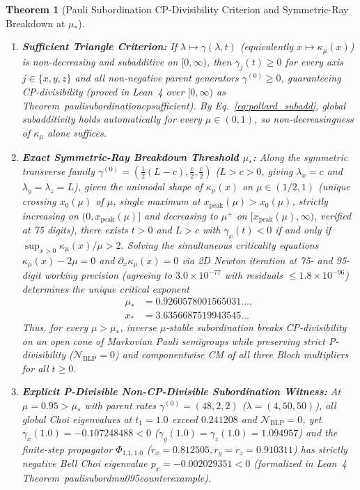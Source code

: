 \documentclass[twocolumn,10pt,amsmath,amssymb,floatfix]{revtex4-2}
\theoremstyle{plain}
\newtheorem{theorem}{Theorem}
\theoremstyle{definition}
\newcommand{\NBLP}{\mathcal{N}_{\mathrm{BLP}}}
\newcommand{\mustar}{\mu_*}
\newcommand{\leanid}[1]{{\footnotesize\ttfamily\def\_{\textunderscore\penalty0\hspace{0pt}}#1}}
\begin{document}
\begin{theorem}[Pauli Subordination CP-Divisibility Criterion and Symmetric-Ray Breakdown at $\mustar$]
\label{thm:pauli_subord}\mbox{}
\begin{enumerate}[label=(\alph*),leftmargin=1.5em,itemsep=2pt]
\item \textbf{Sufficient Triangle Criterion:} If $\lambda \mapsto \gamma(\lambda,t)$ (equivalently $x \mapsto \kappa_\mu(x)$) is non-decreasing and subadditive on $[0,\infty)$, then $\gamma_j(t) \ge 0$ for every axis $j \in \{x,y,z\}$ and all non-negative parent generators $\gamma^{(0)} \ge 0$, guaranteeing CP-divisibility (proved in Lean~4 over $[0,\infty)$ as Theorem~\leanid{pauli\_subordination\_cp\_sufficient}). By Eq.~\eqref{eq:pollard_subadd}, global subadditivity holds automatically for every $\mu \in (0,1)$, so non-decreasingness of $\kappa_\mu$ alone suffices.
\item \textbf{Exact Symmetric-Ray Breakdown Threshold $\mustar$:} Along the symmetric transverse family $\gamma^{(0)} = (\frac{1}{2}(L-c), \frac{c}{2}, \frac{c}{2})$ ($L > c > 0$, giving $\lambda_x = c$ and $\lambda_y = \lambda_z = L$), given the unimodal shape of $\kappa_\mu(x)$ on $\mu \in (1/2, 1)$ (unique crossing $x_0(\mu)$ of $\mu$, single maximum at $x_{\mathrm{peak}}(\mu) > x_0(\mu)$, strictly increasing on $(0, x_{\mathrm{peak}}(\mu)]$ and decreasing to $\mu^+$ on $[x_{\mathrm{peak}}(\mu), \infty)$, verified at 75 digits), there exists $t > 0$ and $L > c$ with $\gamma_x(t) < 0$ if and only if $\sup_{x>0} \kappa_\mu(x)/\mu > 2$. Solving the simultaneous criticality equations $\kappa_\mu(x) - 2\mu = 0$ and $\partial_x\kappa_\mu(x) = 0$ via 2D Newton iteration at 75- and 95-digit working precision (agreeing to $3.0 \times 10^{-77}$ with residuals $\le 1.8 \times 10^{-96}$) determines the unique critical exponent
\begin{align}
\label{eq:mustar_exact}
\mustar &= 0.9260578001565031\dots, \nonumber\\
x_* &= 3.6356687519943545\dots
\end{align}
Thus, for every $\mu > \mustar$, inverse $\mu$-stable subordination breaks CP-divisibility on an open cone of Markovian Pauli semigroups while preserving strict P-divisibility ($\NBLP = 0$) and componentwise CM of all three Bloch multipliers for all $t \ge 0$.
\item \textbf{Explicit P-Divisible Non-CP-Divisible Subordination Witness:} At $\mu = 0.95 > \mustar$ with parent rates $\gamma^{(0)} = (48, 2, 2)$ ($\lambda = (4, 50, 50)$), all global Choi eigenvalues at $t_1 = 1.0$ exceed $0.241208$ and $\NBLP = 0$, yet $\gamma_x(1.0) = -0.107248488 < 0$ ($\gamma_y(1.0)=\gamma_z(1.0)=1.094957$) and the finite-step propagator $\Phi_{1.1, 1.0}$ ($r_x = 0.812505, r_y = r_z = 0.910311$) has strictly negative Bell Choi eigenvalue $p_x = -0.002029351 < 0$ (formalized in Lean~4 Theorem~\leanid{pauli\_subord\_mu095\_counterexample}).
\end{enumerate}
\end{theorem}
\end{document}
